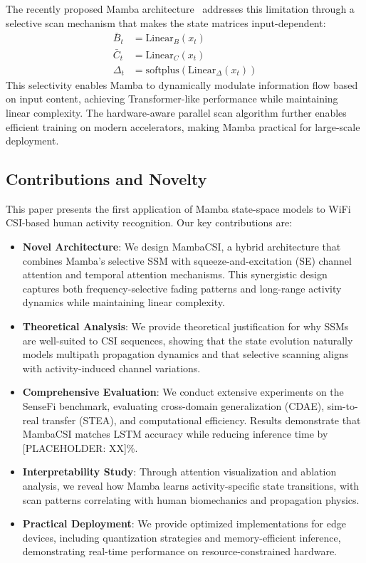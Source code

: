 \documentclass[journal]{IEEEtran}
\begin{document}
The recently proposed Mamba architecture~\cite{gu2023mamba} addresses this limitation through a selective scan mechanism that makes the state matrices input-dependent:
\begin{align}
\bar{B}_t &= \text{Linear}_B(x_t) \\
\bar{C}_t &= \text{Linear}_C(x_t) \\
\Delta_t &= \text{softplus}(\text{Linear}_\Delta(x_t))
\end{align}
This selectivity enables Mamba to dynamically modulate information flow based on input content, achieving Transformer-like performance while maintaining linear complexity. The hardware-aware parallel scan algorithm further enables efficient training on modern accelerators, making Mamba practical for large-scale deployment.

\subsection{Contributions and Novelty}

This paper presents the first application of Mamba state-space models to WiFi CSI-based human activity recognition. Our key contributions are:

\begin{itemize}
\item \textbf{Novel Architecture}: We design MambaCSI, a hybrid architecture that combines Mamba's selective SSM with squeeze-and-excitation (SE) channel attention and temporal attention mechanisms. This synergistic design captures both frequency-selective fading patterns and long-range activity dynamics while maintaining linear complexity.

\item \textbf{Theoretical Analysis}: We provide theoretical justification for why SSMs are well-suited to CSI sequences, showing that the state evolution naturally models multipath propagation dynamics and that selective scanning aligns with activity-induced channel variations.

\item \textbf{Comprehensive Evaluation}: We conduct extensive experiments on the SenseFi benchmark, evaluating cross-domain generalization (CDAE), sim-to-real transfer (STEA), and computational efficiency. Results demonstrate that MambaCSI matches LSTM accuracy while reducing inference time by [PLACEHOLDER: XX]\%.

\item \textbf{Interpretability Study}: Through attention visualization and ablation analysis, we reveal how Mamba learns activity-specific state transitions, with scan patterns correlating with human biomechanics and propagation physics.

\item \textbf{Practical Deployment}: We provide optimized implementations for edge devices, including quantization strategies and memory-efficient inference, demonstrating real-time performance on resource-constrained hardware.
\end{itemize}
\end{document}
